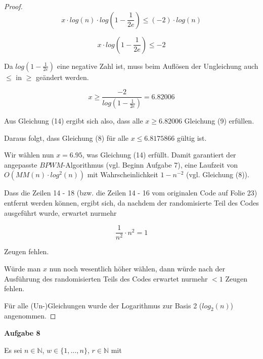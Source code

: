 \documentclass{article}
\begin{document}
\begin{proof}
  \begin{equation}
    x \cdot log \left( n \right) \cdot log \left( 1 - \frac{1}{2e} \right) \leq (-2) \cdot log \left( n \right)
  \end{equation}

  \begin{equation}
    x \cdot log \left( 1 - \frac{1}{2e} \right) \leq -2
  \end{equation}

  Da $log \left( 1 - \frac{1}{2e} \right)$ eine negative Zahl ist, muss beim
  Aufl{\"o}sen der Ungleichung auch $\leq$ in $\geq$ ge{\"a}ndert werden.

  \begin{equation}
    x \geq \frac{-2}{log \left( 1 - \frac{1}{2e} \right)} = 6.82006
  \end{equation}

  Aus Gleichung (14) ergibt sich also, dass alle $x \geq 6.82006$ Gleichung (9)
  erf{\"u}llen. \newline

  Daraus folgt, dass Gleichung (8) f{\"u}r alle $x \leq 6.8175866$ g{\"u}ltig ist.

  Wir w{\"a}hlen nun $x = 6.95$, was Gleichung (14) erf{\"u}llt. \newline
  Damit garantiert der angepasste $BPWM$-Algorithmus (vgl. Beginn Aufgabe 7),
  eine Laufzeit von $O \left( MM \left( n \right) \cdot log^2(n) \right)$ mit
  Wahrscheinlichkeit $1 - n^{-2}$  (vgl. Gleichung (8)).

  Dass die Zeilen 14 - 18 (bzw. die Zeilen 14 - 16 vom originalen Code auf Folie
  23) entfernt werden k{\"o}nnen, ergibt sich, da nachdem der randomisierte
  Teil des Codes ausgef{\"u}hrt wurde, erwartet nurmehr

  \begin{equation}
    \frac{1}{n^2} \cdot n^2 = 1
  \end{equation}

  Zeugen fehlen.

  W{\"u}rde man $x$ nun noch wesentlich h{\"o}her w{\"a}hlen, dann w{\"u}rde
  nach der Ausf{\"u}hrung des randomisierten Teils des Codes erwartet nurmehr
  $< 1$ Zeugen fehlen.

  F{\"u}r alle (Un-)Gleichungen wurde der Logarithmus zur Basis 2 ($log_2(n)$)
  angenommen.
\end{proof}

\newpage
{\noindent\bfseries Aufgabe 8}%
\medskip%

\noindent
Es sei $n \in \mathbb{N}$, $w \in \{ 1, \ldots, n \}$, $r \in \mathbb{N}$ mit
\end{document}
